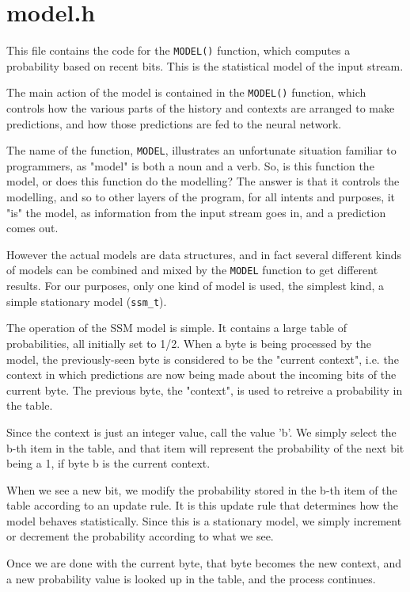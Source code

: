 \documentclass[10pt, fleqn]{article}
\theoremstyle{break}
\newcommand{\0}    {\mathbf{0}}
\numberwithin{equation}{section}
\begin{document}
\section{model.h}
\begin{snugshade}
This file contains the code for the {\tt MODEL()} function, which computes a
probability based on recent bits. This is the statistical model of the input
stream.

The main action of the model is contained in the {\tt MODEL()} function, which
controls how the various parts of the history and contexts are arranged to make
predictions, and how those predictions are fed to the neural network. 

The name of the function, {\tt MODEL}, illustrates an unfortunate situation
familiar to programmers, as "model" is both a noun and a verb. So, is this
function the model, or does this function do the modelling? The answer is
that it controls the modelling, and so to other layers of the program, for
all intents and purposes, it "is" the model, as information from the input
stream goes in, and a prediction comes out.

However the actual models are data structures, and in fact several different
kinds of models can be combined and mixed by the {\tt MODEL} function to get 
different results. For our purposes, only one kind of model is used, the 
simplest kind, a simple stationary model ({\tt ssm\_t}).

The operation of the SSM model is simple. It contains a large table of 
probabilities, all initially set to 1/2. When a byte is being processed
by the model, the previously-seen byte is considered to be the "current context",
i.e. the context in which predictions are now being made about the incoming
bits of the current byte. The previous byte, the "context", is used to retreive
a probability in the table. 

Since the context is just an integer value, call the value 'b'. We simply 
select the b-th item in the table, and that item will represent the probability 
of the next bit being a 1, if byte b is the current context. 

When we see a new bit, we modify the probability stored in the b-th item
of the table according to an update rule. It is this update rule that 
determines how the model behaves statistically.
Since this is a stationary model, we simply increment or decrement the
probability according to what we see.

Once we are done with the current byte, that byte becomes the new context,
and a new probability value is looked up in the table, and the process
continues.
\end{snugshade}
\inputminted[mathescape,
               linenos,
               firstnumber=last,
               numbersep=5pt,
               gobble=0,
               frame=none,
               fontsize=\small,
               framesep=2mm]{c}{../model.h}
\end{document}

